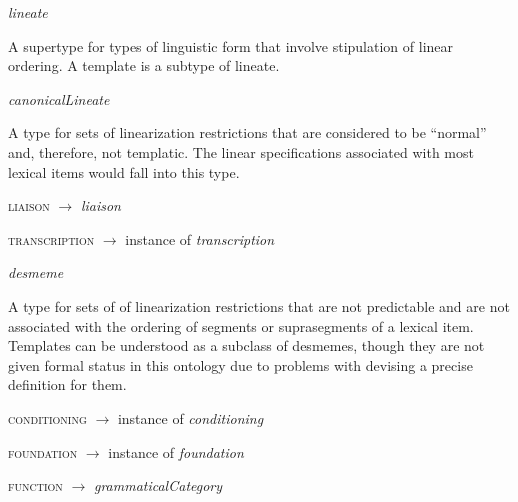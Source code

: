 \begin{ontologytop}
\begin{proplist}
	\end{proplist}

	\begin{classlist}

	\item \emph{lineate}
	\hspace{1em}\parbox[t]{\linegoal}{\footnotesize A supertype for types of linguistic form that involve stipulation of linear ordering. A template is a subtype of lineate.}


		\begin{classlist}

		\item \emph{canonicalLineate}
		\hspace{1em}\parbox[t]{\linegoal}{\footnotesize A type for sets of linearization restrictions that are considered to be ``normal'' and, therefore, not templatic. The linear specifications associated with most lexical items would fall into this type.}


			\begin{proplist}

			\item \textsc{liaison} $\rightarrow$  \emph{liaison}

			\item \textsc{transcription} $\rightarrow$ instance of \emph{transcription}

			\end{proplist}

		\item \emph{desmeme}
		\hspace{1em}\parbox[t]{\linegoal}{\footnotesize A type for sets of of linearization restrictions that are not predictable and are not associated with the ordering of segments or suprasegments of a lexical item. Templates can be understood as a subclass of desmemes, though they are not given formal status in this ontology due to problems with devising a precise definition for them.}


			\begin{proplist}

			\item \textsc{conditioning} $\rightarrow$ instance of \emph{conditioning}

			\item \textsc{foundation} $\rightarrow$ instance of \emph{foundation}

			\item \textsc{function} $\rightarrow$  \emph{grammaticalCategory}


\end{proplist}
\end{classlist}
\end{classlist}
\end{ontologytop}
